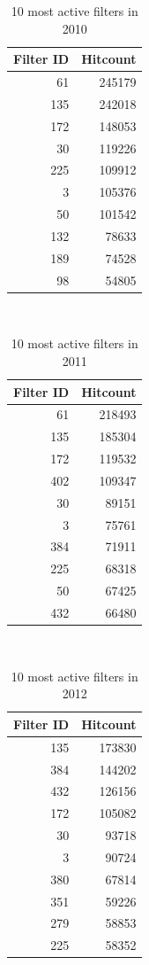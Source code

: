 \documentclass{sigchi}
\begin{document}
\begin{table}
  \centering
  \begin{tabular}{r r }
    Filter ID & Hitcount \\
    \hline
    61 & 245179 \\
    135 & 242018 \\
    172 & 148053 \\
    30 & 119226 \\
    225 & 109912 \\
    3 & 105376 \\
    50 & 101542 \\
    132 & 78633 \\
    189 & 74528 \\
    98 & 54805 \\
  \end{tabular}
  \caption{10 most active filters in 2010}~\label{tab:most-active-2010}
\end{table}

\begin{table}
  \centering
  \begin{tabular}{r r }
    Filter ID & Hitcount \\
    \hline
    61 & 218493 \\
    135 & 185304 \\
    172 & 119532 \\
    402 & 109347 \\
    30 & 89151 \\
    3 & 75761 \\
    384 & 71911 \\
    225 & 68318 \\
    50 & 67425 \\
    432 & 66480 \\
  \end{tabular}
  \caption{10 most active filters in 2011}~\label{tab:most-active-2011}
\end{table}

\begin{table}
  \centering
  \begin{tabular}{r r }
    Filter ID & Hitcount \\
    \hline
    135 & 173830 \\
    384 & 144202 \\
    432 & 126156 \\
    172 & 105082 \\
    30 & 93718 \\
    3 & 90724 \\
    380 & 67814 \\
    351 & 59226 \\
    279 & 58853 \\
    225 & 58352 \\
  \end{tabular}
  \caption{10 most active filters in 2012}~\label{tab:most-active-2012}
\end{table}
\end{document}
